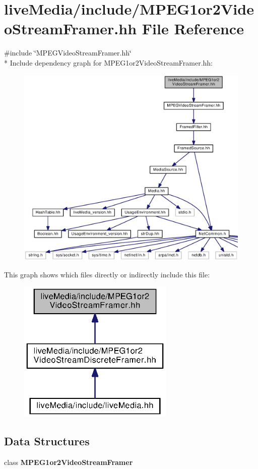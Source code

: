 \section{live\+Media/include/\+M\+P\+E\+G1or2\+Video\+Stream\+Framer.hh File Reference}
\label{MPEG1or2VideoStreamFramer_8hh}
{\ttfamily \#include \char`\"{}M\+P\+E\+G\+Video\+Stream\+Framer.\+hh\char`\"{}}\\*
Include dependency graph for M\+P\+E\+G1or2\+Video\+Stream\+Framer.\+hh\+:
\nopagebreak
\begin{figure}[H]
\begin{center}
\leavevmode
\includegraphics[width=350pt]{MPEG1or2VideoStreamFramer_8hh__incl}
\end{center}
\end{figure}
This graph shows which files directly or indirectly include this file\+:
\nopagebreak
\begin{figure}[H]
\begin{center}
\leavevmode
\includegraphics[width=211pt]{MPEG1or2VideoStreamFramer_8hh__dep__incl}
\end{center}
\end{figure}
\subsection*{Data Structures}
\begin{DoxyCompactItemize}
\item 
class {\bf M\+P\+E\+G1or2\+Video\+Stream\+Framer}
\end{DoxyCompactItemize}
